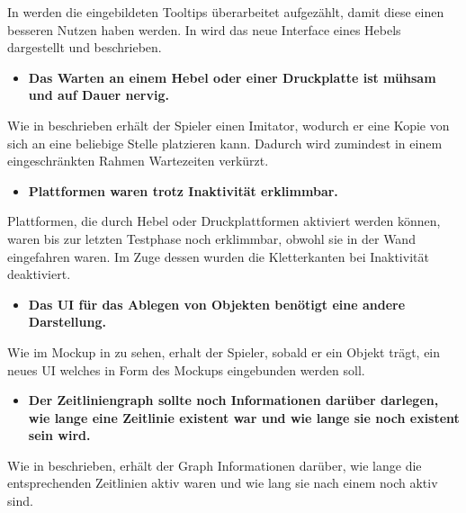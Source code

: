 In  werden die eingebildeten Tooltips überarbeitet aufgezählt, damit diese einen besseren Nutzen haben werden. In  wird das neue Interface eines Hebels dargestellt und beschrieben.

\begin{itemize}  
    \item \textbf{Das Warten an einem Hebel oder einer Druckplatte ist mühsam und auf Dauer nervig.}
\end{itemize}

Wie in  beschrieben erhält der Spieler einen Imitator, wodurch er eine Kopie von sich an eine beliebige Stelle platzieren kann. Dadurch wird zumindest in einem eingeschränkten Rahmen Wartezeiten verkürzt.

\begin{itemize}  
    \item \textbf{Plattformen waren trotz Inaktivität erklimmbar.}
\end{itemize}

Plattformen, die durch Hebel oder Druckplattformen aktiviert werden können, waren bis zur letzten Testphase noch erklimmbar, obwohl sie in der Wand eingefahren waren. Im Zuge dessen wurden die Kletterkanten bei Inaktivität deaktiviert.

\begin{itemize}  
    \item \textbf{Das \ac{UI} für das Ablegen von Objekten benötigt eine andere Darstellung.}
\end{itemize}

Wie im Mockup in  zu sehen, erhalt der Spieler, sobald er ein Objekt trägt, ein neues \ac{UI} welches in Form des Mockups eingebunden werden soll.

\begin{itemize}  
    \item \textbf{Der Zeitliniengraph sollte noch Informationen darüber darlegen, wie lange eine Zeitlinie existent war und wie lange sie noch existent sein wird.}
\end{itemize}

Wie in  beschrieben, erhält der Graph Informationen darüber, wie lange die entsprechenden Zeitlinien aktiv waren und wie lang sie nach einem  noch aktiv sind.

